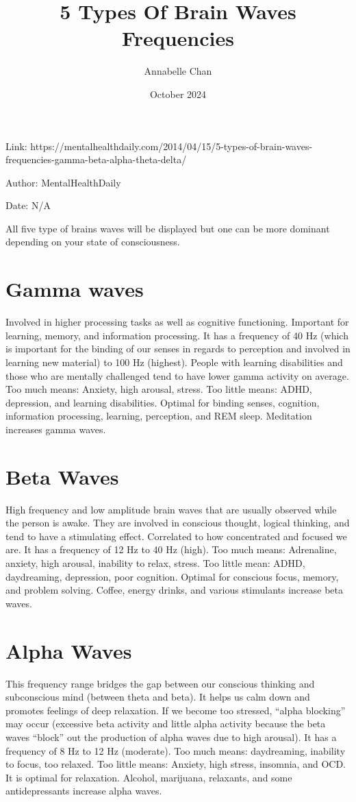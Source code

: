 \documentclass[12pt]{article}
\title{5 Types Of Brain Waves Frequencies}
\author{Annabelle Chan}
\date{October 2024}
\begin{document}
\maketitle
Link: https://mentalhealthdaily.com/2014/04/15/5-types-of-brain-waves-frequencies-gamma-beta-alpha-theta-delta/

Author: MentalHealthDaily

Date: N/A\newline

All five type of brains waves will be displayed but one can be more dominant depending on your state of consciousness.

\section{Gamma waves} 
Involved in higher processing tasks as well as cognitive functioning. 
Important for learning, memory, and information processing.
It has a frequency of 40 Hz (which is important for the binding of our senses in regards to perception and involved in learning new material) to 100 Hz (highest).
People with learning disabilities and those who are mentally challenged tend to have lower gamma activity on average.
Too much means: Anxiety, high arousal, stress.
Too little means: ADHD, depression, and learning disabilities.
Optimal for binding senses, cognition, information processing, learning, perception, and REM sleep.
Meditation increases gamma waves.

\section{Beta Waves} 
High frequency and low amplitude brain waves that are usually observed while the person is awake. 
They are involved in conscious thought, logical thinking, and tend to have a stimulating effect.
Correlated to how concentrated and focused we are.
It has a frequency of 12 Hz to 40 Hz (high).
Too much means: Adrenaline, anxiety, high arousal, inability to relax, stress.
Too little mean: ADHD, daydreaming, depression, poor cognition.
Optimal for conscious focus, memory, and problem solving.
Coffee, energy drinks, and various stimulants increase beta waves.

\section{Alpha Waves} 
This frequency range bridges the gap between our conscious thinking and subconscious mind (between theta and beta).
It helps us calm down and promotes feelings of deep relaxation.
If we become too stressed, “alpha blocking” may occur (excessive beta activity and little alpha activity because the beta waves “block” out the production of alpha waves due to high arousal).
It has a frequency of 8 Hz to 12 Hz (moderate).
Too much means: daydreaming, inability to focus, too relaxed.
Too little means: Anxiety, high stress, insomnia, and OCD.
It is optimal for relaxation.
Alcohol, marijuana, relaxants, and some antidepressants increase alpha waves.
\end{document}
